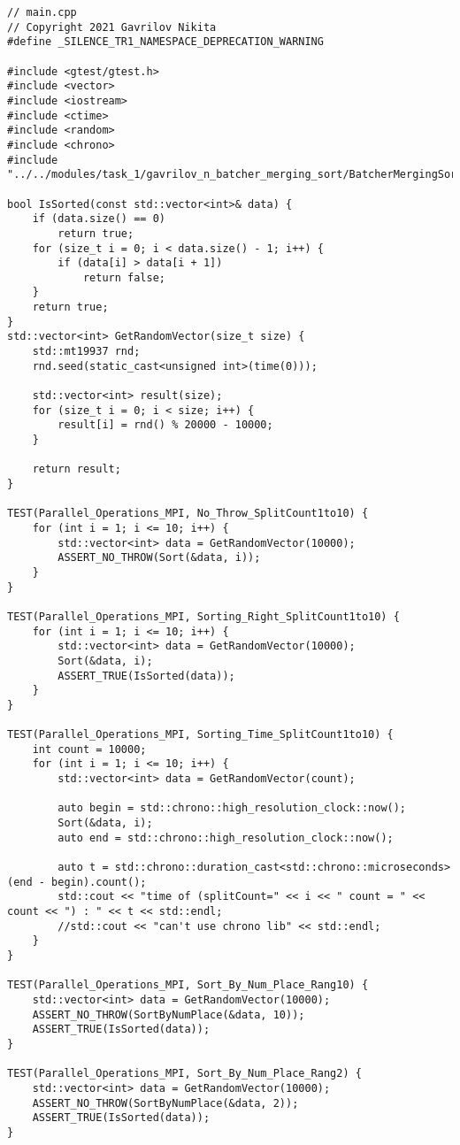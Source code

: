 \documentclass{report}
\begin{document}
\begin{lstlisting}
// main.cpp
// Copyright 2021 Gavrilov Nikita
#define _SILENCE_TR1_NAMESPACE_DEPRECATION_WARNING

#include <gtest/gtest.h>
#include <vector>
#include <iostream>
#include <ctime>
#include <random>
#include <chrono>
#include "../../modules/task_1/gavrilov_n_batcher_merging_sort/BatcherMergingSort.h"

bool IsSorted(const std::vector<int>& data) {
    if (data.size() == 0)
        return true;
    for (size_t i = 0; i < data.size() - 1; i++) {
        if (data[i] > data[i + 1])
            return false;
    }
    return true;
}
std::vector<int> GetRandomVector(size_t size) {
    std::mt19937 rnd;
    rnd.seed(static_cast<unsigned int>(time(0)));

    std::vector<int> result(size);
    for (size_t i = 0; i < size; i++) {
        result[i] = rnd() % 20000 - 10000;
    }

    return result;
}

TEST(Parallel_Operations_MPI, No_Throw_SplitCount1to10) {
    for (int i = 1; i <= 10; i++) {
        std::vector<int> data = GetRandomVector(10000);
        ASSERT_NO_THROW(Sort(&data, i));
    }
}

TEST(Parallel_Operations_MPI, Sorting_Right_SplitCount1to10) {
    for (int i = 1; i <= 10; i++) {
        std::vector<int> data = GetRandomVector(10000);
        Sort(&data, i);
        ASSERT_TRUE(IsSorted(data));
    }
}

TEST(Parallel_Operations_MPI, Sorting_Time_SplitCount1to10) {
    int count = 10000;
    for (int i = 1; i <= 10; i++) {
        std::vector<int> data = GetRandomVector(count);

        auto begin = std::chrono::high_resolution_clock::now();
        Sort(&data, i);
        auto end = std::chrono::high_resolution_clock::now();

        auto t = std::chrono::duration_cast<std::chrono::microseconds>(end - begin).count();
        std::cout << "time of (splitCount=" << i << " count = " << count << ") : " << t << std::endl;
        //std::cout << "can't use chrono lib" << std::endl;
    }
}

TEST(Parallel_Operations_MPI, Sort_By_Num_Place_Rang10) {
    std::vector<int> data = GetRandomVector(10000);
    ASSERT_NO_THROW(SortByNumPlace(&data, 10));
    ASSERT_TRUE(IsSorted(data));
}

TEST(Parallel_Operations_MPI, Sort_By_Num_Place_Rang2) {
    std::vector<int> data = GetRandomVector(10000);
    ASSERT_NO_THROW(SortByNumPlace(&data, 2));
    ASSERT_TRUE(IsSorted(data));
}


\end{lstlisting}
\end{document}

